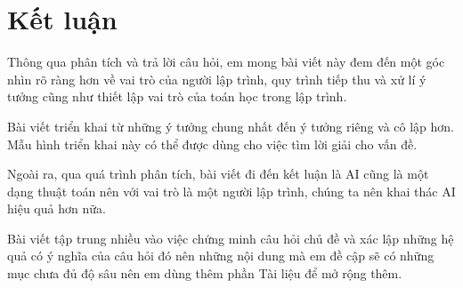\documentclass[12pt]{article}
\begin{document}
\section{Kết luận}
	Thông qua phân tích và trả lời câu hỏi, em mong bài viết này đem đến một góc nhìn rõ ràng hơn về vai trò của người lập trình, quy trình tiếp thu và xử lí ý tưởng cũng như thiết lập vai trò của toán học trong lập trình.
	
	Bài viết triển khai từ những ý tưởng chung nhất đến ý tưởng riêng và cô lập hơn. Mẫu hình triển khai này có thể được dùng cho việc tìm lời giải cho vấn đề.
	
	Ngoài ra, qua quá trình phân tích, bài viết đi đến kết luận là AI cũng là một dạng thuật toán nên với vai trò là một người lập trình, chúng ta nên khai thác AI hiệu quả hơn nữa.
 	
 	Bài viết tập trung nhiều vào việc chứng minh câu hỏi chủ đề và xác lập những hệ quả có ý nghĩa của câu hỏi đó nên những nội dung mà em đề cập sẽ có những mục chưa đủ độ sâu nên em dùng thêm phần Tài liệu để mở rộng thêm.
 	
\printbibliography
\end{document}
